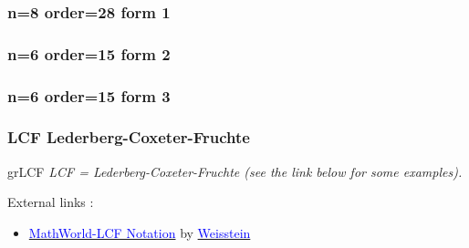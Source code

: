 \subsubsection{n=8 order=28 form 1}\label{cl18a}
\begin{center}
\begin{tkzexample}[vbox]
\end{tkzexample}
\end{center}

\subsubsection{n=6 order=15 form 2}
\begin{center}
\begin{tkzexample}[vbox]
\end{tkzexample}
\end{center}


\subsubsection{n=6 order=15 form 3}
\begin{center}
\begin{tkzexample}[vbox]
\end{tkzexample}
\end{center}
\newpage
\subsubsection{LCF Lederberg-Coxeter-Fruchte}

\begin{NewMacroBox}{grLCF}{   }
\emph{LCF = Lederberg-Coxeter-Fruchte (see the link below for some examples).}

\medskip
External links :

\medskip
\begin{itemize}
\item \href{http://mathworld.wolfram.com/LCFNotation.html}%
           {\textcolor{blue}{MathWorld-LCF Notation}} by %
      \href{http://en.wikipedia.org/wiki/Eric_W._Weisstein}%
           {\textcolor{blue}{Weisstein}}
\end{itemize}
\end{NewMacroBox}


